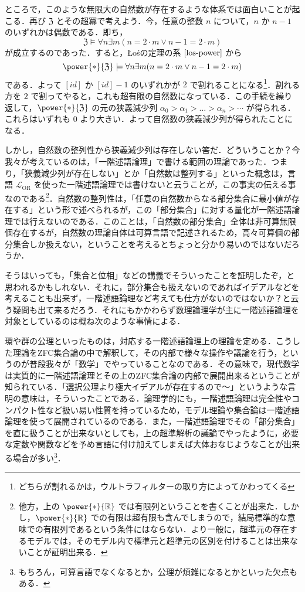 \documentclass[a4j]{jsarticle}
\newcommand{\Los}{{\L}o\'{s}}
\begin{document}
ところで，このような無限大の自然数が存在するような体系では面白いことが起こる．再び $\mathfrak{Z}$ とその超冪で考えよう．今，任意の整数 $n$ について，$n$ か $n-1$ のいずれかは偶数である．即ち，
\[
 \mathfrak{Z} \models \forall n \exists m (n = 2 \cdot m \vee n - 1 = 2\cdot m)
\]
が成立するのであった．すると，\Los の定理の系 $\ref{los-power}$ から
\[
 \power{*}{\mathfrak{Z}} \models \forall n \exists m (n = 2 \cdot m \vee n - 1 = 2\cdot m)
\]
である．よって $[id]$ か $[id]-1$ のいずれかが $2$ で割れることになる\footnote{どちらが割れるかは，ウルトラフィルターの取り方によってかわってくる}．割れる方を $2$ で割ってやると，これも超有限の自然数になっている．この手続を繰り返して，$\power{*}{\mathfrak{Z}}$ の元の狭義減少列 $\alpha_0 > \alpha_1 > \dots > \alpha_n > \cdots$ が得られる．これらはいずれも $0$ より大きい．よって自然数の狭義減少列が得られたことになる．

しかし，自然数の整列性から狭義減少列は存在しない筈だ．どういうことか？今我々が考えているのは，「一階述語論理」で書ける範囲の理論であった．つまり，「狭義減少列が存在しない」とか「自然数は整列する」といった概念は，言語 $\mathcal{L}_{\mathrm{OR}}$ を使った一階述語論理では書けないと云うことが，この事実の伝える事なのである\footnote{他方，上の $\power{*}{\R}$ では有限列ということを書くことが出来た．しかし，$\power{*}{\R}$ での有限は超有限も含んでしまうので，結局標準的な意味での有限列であるという条件にはならない．より一般に，超準元の存在するモデルでは，そのモデル内で標準元と超準元の区別を付けることは出来ないことが証明出来る．}．自然数の整列性は，「任意の自然数からなる部分集合に最小値が存在する」という形で述べられるが，この「部分集合」に対する量化が一階述語論理では行えないのである．このことは，「自然数の部分集合」全体は非可算無限個存在するが，自然数の理論自体は可算言語で記述されるため，高々可算個の部分集合しか扱えない，ということを考えるとちょっと分かり易いのではないだろうか．

そうはいっても，「集合と位相」などの講義でそういったことを証明したぞ，と思われるかもしれない．それに，部分集合も扱えないのであればイデアルなどを考えることも出来ず，一階述語論理など考えても仕方がないのではないか？と云う疑問も出て来るだろう．それにもかかわらず数理論理学が主に一階述語論理を対象としているのは概ね次のような事情による．

環や群の公理といったものは，対応する一階述語論理上の理論を定める．こうした理論をZFC集合論の中で解釈して，その内部で様々な操作や議論を行う，というのが普段我々が「数学」でやっていることなのである．その意味で，現代数学は実質的に一階述語論理とその上のZFC集合論の内部で展開出来るということが知られている．「選択公理より極大イデアルが存在するので〜」というような言明の意味は，そういったことである．論理学的にも，一階述語論理は完全性やコンパクト性など扱い易い性質を持っているため，モデル理論や集合論は一階述語論理を使って展開されているのである．また，一階述語論理でその「部分集合」を直に扱うことが出来ないとしても，上の超準解析の議論でやったように，必要な定数や関数などを予め言語に付け加えてしまえば大体おなじようなことが出来る場合が多い\footnote{もちろん，可算言語でなくなるとか，公理が煩雑になるとかといった欠点もある．}．
\end{document}
